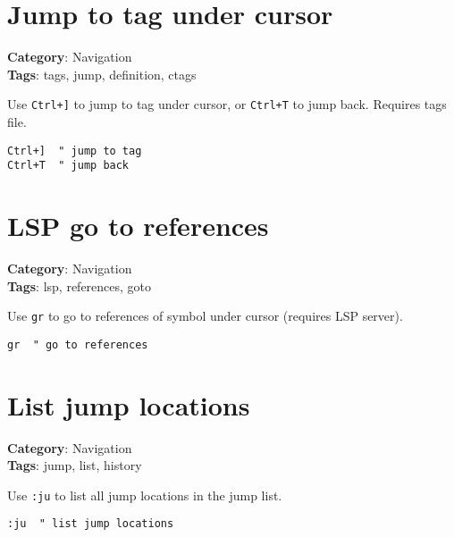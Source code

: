 {{{{{{{{{{\section{Jump to tag under cursor}

\textbf{Category}: Navigation\\ \textbf{Tags}: tags, jump, definition, ctags
\vspace{0.5cm}

Use {\footnotesize \Verb§Ctrl+]§} to jump to tag under cursor, or {\footnotesize \Verb§Ctrl+T§} to jump back. Requires tags file.

\begin{Exa*}{}
\begin{Verbatim}[fontsize=\footnotesize, breaklines, breakanywhere]
Ctrl+]  " jump to tag
Ctrl+T  " jump back
\end{Verbatim}
\end{Exa*}

\section{LSP go to references}

\textbf{Category}: Navigation\\ \textbf{Tags}: lsp, references, goto
\vspace{0.5cm}

Use {\footnotesize \Verb§gr§} to go to references of symbol under cursor (requires LSP server).

\begin{Exa*}{}
\begin{Verbatim}[fontsize=\footnotesize, breaklines, breakanywhere]
gr  " go to references
\end{Verbatim}
\end{Exa*}

\section{List jump locations}

\textbf{Category}: Navigation\\ \textbf{Tags}: jump, list, history
\vspace{0.5cm}

Use {\footnotesize \Verb§:ju§} to list all jump locations in the jump list.

\begin{Exa*}{}
\begin{Verbatim}[fontsize=\footnotesize, breaklines, breakanywhere]
:ju  " list jump locations
\end{Verbatim}
\end{Exa*}

}}}}}}}}}}
